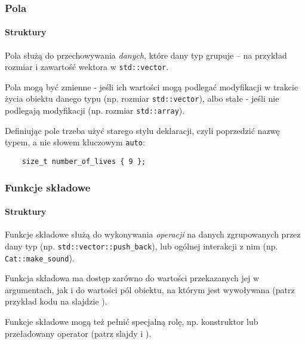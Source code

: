 \documentclass[aspectratio=169,10pt]{beamer}
\begin{document}
\begin{frame}[fragile]
    \frametitle{Pola}
    \framesubtitle{Struktury}

    Pola służą do przechowywania \emph{danych}, które dany typ grupuje -- na
    przykład rozmiar i zawartość wektora w \texttt{std::vector}.

    \vspace{1em}

    Pola mogą być zmienne - jeśli ich wartości mogą podlegać modyfikacji w
    trakcie życia obiektu danego typu (np. rozmiar {\tt std::vector}), albo
    stałe - jeśli nie podlegają modyfikacji (np. rozmiar {\tt std::array}).

    \vspace{1em}

    Definiując pole trzeba użyć starego stylu deklaracji, czyli poprzedzić nazwę
    typem, a nie słowem kluczowym {\tt auto}:

    {\scriptsize
    \begin{lstlisting}
    size_t number_of_lives { 9 };
    \end{lstlisting}}
\end{frame}

\begin{frame}
    \frametitle{Funkcje składowe}
    \framesubtitle{Struktury}

    Funkcje składowe służą do wykonywania \emph{operacji} na danych zgrupowanych
    przez dany typ (np. {\tt std::vector::push\_back}), lub ogólnej
    interakcji z nim (np. {\tt Cat::make\_sound}).

    \vspace{1em}

    Funkcja składowa ma dostęp zarówno do wartości przekazanych jej w
    argumentach, jak i do wartości pól obiektu, na którym jest wywoływana (patrz
    przykład kodu na slajdzie \pageref{struct_cat_example_full}).

    \vspace{1em}

    Funkcje składowe mogą też pełnić specjalną rolę, np. konstruktor lub
    przeładowany operator (patrz slajdy \pageref{ctor_example} i
    \pageref{overloaded_operator_example}).
\end{frame}
\end{document}
